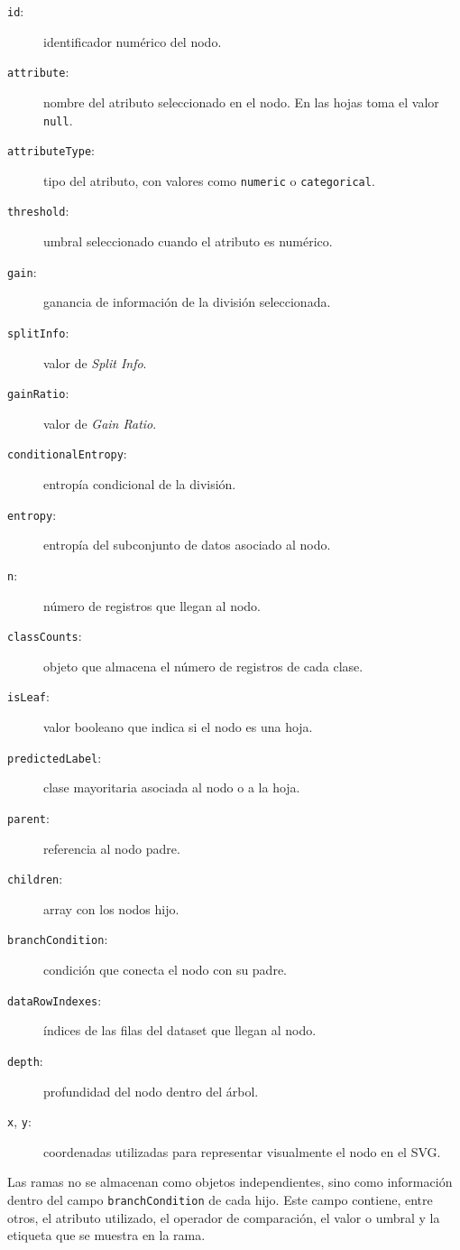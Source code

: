 \begin{description}
    \item[\texttt{id}:] identificador numérico del nodo.
    \item[\texttt{attribute}:] nombre del atributo seleccionado en el nodo. En las hojas toma el valor \texttt{null}.
    \item[\texttt{attributeType}:] tipo del atributo, con valores como \texttt{numeric} o \texttt{categorical}.
    \item[\texttt{threshold}:] umbral seleccionado cuando el atributo es numérico.
    \item[\texttt{gain}:] ganancia de información de la división seleccionada.
    \item[\texttt{splitInfo}:] valor de \textit{Split Info}.
    \item[\texttt{gainRatio}:] valor de \textit{Gain Ratio}.
    \item[\texttt{conditionalEntropy}:] entropía condicional de la división.
    \item[\texttt{entropy}:] entropía del subconjunto de datos asociado al nodo.
    \item[\texttt{n}:] número de registros que llegan al nodo.
    \item[\texttt{classCounts}:] objeto que almacena el número de registros de cada clase.
    \item[\texttt{isLeaf}:] valor booleano que indica si el nodo es una hoja.
    \item[\texttt{predictedLabel}:] clase mayoritaria asociada al nodo o a la hoja.
    \item[\texttt{parent}:] referencia al nodo padre.
    \item[\texttt{children}:] array con los nodos hijo.
    \item[\texttt{branchCondition}:] condición que conecta el nodo con su padre.
    \item[\texttt{dataRowIndexes}:] índices de las filas del dataset que llegan al nodo.
    \item[\texttt{depth}:] profundidad del nodo dentro del árbol.
    \item[\texttt{x}, \texttt{y}:] coordenadas utilizadas para representar visualmente el nodo en el SVG.
\end{description}

Las ramas no se almacenan como objetos independientes, sino como información dentro del campo \texttt{branchCondition} de cada hijo. Este campo contiene, entre otros, el atributo utilizado, el operador de comparación, el valor o umbral y la etiqueta que se muestra en la rama.


